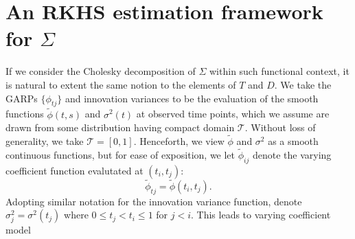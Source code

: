 

\chapter{An RKHS estimation framework for $\Sigma$} \label{SSANOVA-chapter}
%
%
%
%


If we consider the Cholesky decomposition of $\Sigma$ within such functional context, it is natural to extent the same notion to the elements of $T$ and $D$. We take the GARPs $\lbrace \phi_{tj} \rbrace$ and innovation variances to be the evaluation of the smooth functions $\tilde{\phi}\left(t,s\right)$ and $\sigma^2\left(t\right)$ at observed time points, which we assume  are drawn from some distribution having compact domain $\mathcal{T}$. Without loss of generality, we take $\mathcal{T} = \left[0,1\right]$. Henceforth, we view $\tilde{\phi}$ and $\sigma^2$ as a smooth continuous functions, but for ease of exposition, we let $\tilde{\phi}_{ij}$ denote the varying coefficient function evalutated at $\left(t_i,t_j\right)$: 
\[
\tilde{\phi}_{tj} = \tilde{\phi}\left(t_{i},t_{j}\right). 
\]
Adopting similar notation for the innovation variance function, denote $\sigma_{j}^2 = \sigma^2\left(t_{j}\right)$ where $0 \le t_{j} < t_{i} \le 1$ for $j < i$. This leads to varying coefficient model


